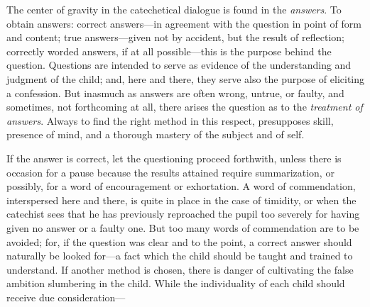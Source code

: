 The center of gravity in the catechetical dialogue is found in the \emph{answers}. To obtain answers: correct answers—in agreement with the question in point of form and content; true answers—given not by accident, but the result of reflection; correctly worded answers, if at all possible—this is the purpose behind the question. Questions are intended to serve as evidence of the understanding and judgment of the child; and, here and there, they serve also the purpose of eliciting a confession. But inasmuch as answers are often wrong, untrue, or faulty, and sometimes, not forthcoming at all, there arises the question as to the \emph{treatment of answers}. Always to find the right method in this respect, presupposes skill, presence of mind, and a thorough mastery of the subject and of self.

If the answer is correct, let the questioning proceed forthwith, unless there is occasion for a pause because the results attained require summarization, or possibly, for a word of encouragement or exhortation. A word of commendation, interspersed here and there, is quite in place in the case of timidity, or when the catechist sees that he has previously reproached the pupil too severely for having given no answer or a faulty one. But too many words of commendation are to be avoided; for, if the question was clear and to the point, a correct answer should naturally be looked for—a fact which the child should be taught and trained to understand. If another method is chosen, there is danger of cultivating the false ambition slumbering in the child. While the individuality of each child should receive due consideration—
